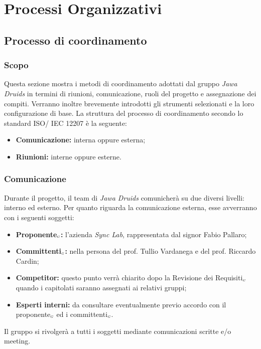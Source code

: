 \chapter{Processi Organizzativi}\label{ProcessiOrganizzativi}

\section{Processo di coordinamento}\label{ProcessiOrganizzativiProcessoDiCoordinamento}

\subsection{Scopo}\label{ProcessiOrganizzativiProcessoDiCoordinamentoScopo}
Questa sezione mostra i metodi di coordinamento adottati dal gruppo \textit{Jawa Druids} in termini di riunioni, comunicazione, ruoli del progetto e assegnazione dei compiti. Verranno inoltre brevemente introdotti gli strumenti selezionati e la loro configurazione di base. La struttura del processo di coordinamento secondo lo standard ISO/ IEC 12207 è la seguente:
\begin{itemize}
	\item \textbf{Comunicazione:} interna oppure esterna;
	\item \textbf{Riunioni:} interne oppure esterne.
\end{itemize}
\subsection{Comunicazione}\label{ProcessiOrganizzativiProcessoDiCoordinamentoComunicazione}
Durante il progetto, il team di \textit{Jawa Druids} comunicherà su due diversi livelli: interno ed esterno.
Per quanto riguarda la comunicazione esterna, esse avverranno con i seguenti soggetti:
\begin{itemize}
\item \textbf{Proponente$_{\scaleto{G}{3pt}}$:} l'azienda \textit{Sync Lab}, rappresentata dal signor Fabio Pallaro;
	\item \textbf{Committenti$_{\scaleto{G}{3pt}}$:} nella persona del prof. Tullio Vardanega e del prof. Riccardo Cardin;
		\item \textbf{Competitor:} questo punto verrà chiarito dopo la Revisione dei Requisiti$_{\scaleto{G}{3pt}}$ quando i capitolati saranno assegnati ai relativi gruppi;
			\item \textbf{Esperti interni:} da consultare eventualmente previo accordo con il proponente$_{\scaleto{G}{3pt}}$ ed i committenti$_{\scaleto{G}{3pt}}$.
\end{itemize}
Il gruppo si rivolgerà a tutti i soggetti mediante comunicazioni scritte e/o meeting.
